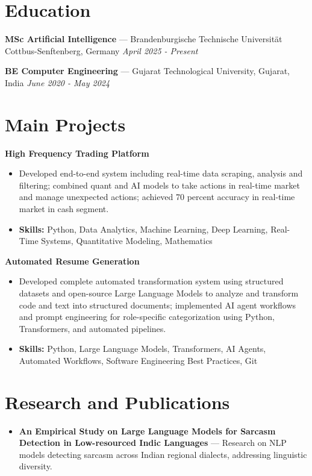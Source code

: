 \documentclass[a4paper,10pt]{article}
\begin{document}
\section*{Education}
\textbf{MSc Artificial Intelligence} — Brandenburgische Technische Universität Cottbus-Senftenberg, Germany \hfill \textit{April 2025 - Present}\par
\vspace{1.5pt}
\textbf{BE Computer Engineering} — Gujarat Technological University, Gujarat, India \hfill \textit{June 2020 - May 2024}\par

\section*{Main Projects}
\textbf{High Frequency Trading Platform}\par
\vspace{1pt}
\begin{itemize}
  \item Developed end-to-end system including real-time data scraping, analysis and filtering; combined quant and AI models to take actions in real-time market and manage unexpected actions; achieved 70 percent accuracy in real-time market in cash segment.
  \item \textbf{Skills:} Python, Data Analytics, Machine Learning, Deep Learning, Real-Time Systems, Quantitative Modeling, Mathematics
\end{itemize}
\vspace{3pt}
\textbf{Automated Resume Generation}\par
\vspace{1pt}
\begin{itemize}
  \item Developed complete automated transformation system using structured datasets and open-source Large Language Models to analyze and transform code and text into structured documents; implemented AI agent workflows and prompt engineering for role-specific categorization using Python, Transformers, and automated pipelines.
  \item \textbf{Skills:} Python, Large Language Models, Transformers, AI Agents, Automated Workflows, Software Engineering Best Practices, Git
\end{itemize}

\section*{Research and Publications}
\begin{itemize}
\item \textbf{An Empirical Study on Large Language Models for Sarcasm Detection in Low-resourced Indic Languages} — Research on NLP models detecting sarcasm across Indian regional dialects, addressing linguistic diversity.
\end{itemize}
\end{document}
